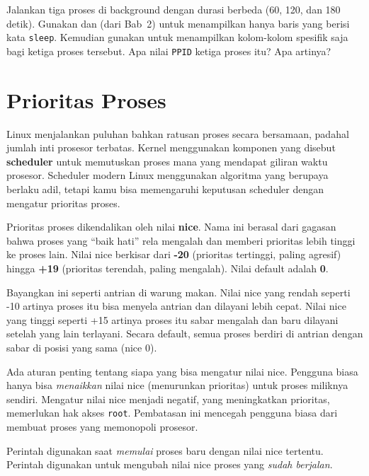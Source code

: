 \begin{challengebox}
Jalankan tiga proses  di background dengan durasi berbeda (60, 120, dan 180
detik). Gunakan  dan  (dari Bab~2) untuk menampilkan hanya baris
yang berisi kata \texttt{sleep}. Kemudian gunakan 
untuk menampilkan kolom-kolom spesifik saja bagi ketiga proses tersebut. Apa nilai
\texttt{PPID} ketiga proses itu? Apa artinya?
\end{challengebox}

\section{Prioritas Proses}
\label{sec:process-scheduling}

Linux menjalankan puluhan bahkan ratusan proses secara bersamaan, padahal jumlah inti
prosesor terbatas. Kernel menggunakan komponen yang disebut \textbf{scheduler} untuk
memutuskan proses mana yang mendapat giliran waktu prosesor. Scheduler modern Linux
menggunakan algoritma yang berupaya berlaku adil, tetapi kamu bisa memengaruhi keputusan
scheduler dengan mengatur prioritas proses.

Prioritas proses dikendalikan oleh nilai \textbf{nice}. Nama ini berasal dari gagasan
bahwa proses yang ``baik hati'' rela mengalah dan memberi prioritas lebih tinggi ke proses
lain. Nilai nice berkisar dari \textbf{-20} (prioritas tertinggi, paling agresif) hingga
\textbf{+19} (prioritas terendah, paling mengalah). Nilai default adalah \textbf{0}.

Bayangkan ini seperti antrian di warung makan. Nilai nice yang rendah seperti -10 artinya
proses itu bisa menyela antrian dan dilayani lebih cepat. Nilai nice yang tinggi seperti
+15 artinya proses itu sabar mengalah dan baru dilayani setelah yang lain terlayani.
Secara default, semua proses berdiri di antrian dengan sabar di posisi yang sama (nice 0).

Ada aturan penting tentang siapa yang bisa mengatur nilai nice. Pengguna biasa hanya bisa
\textit{menaikkan} nilai nice (menurunkan prioritas) untuk proses miliknya sendiri. Mengatur
nilai nice menjadi negatif, yang meningkatkan prioritas, memerlukan hak akses \texttt{root}.
Pembatasan ini mencegah pengguna biasa dari membuat proses yang memonopoli prosesor.

Perintah  digunakan saat \textit{memulai} proses baru dengan nilai nice tertentu.
Perintah  digunakan untuk mengubah nilai nice proses yang \textit{sudah berjalan}.

